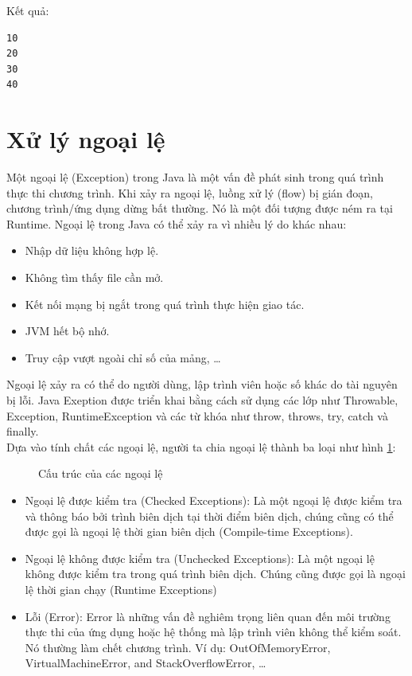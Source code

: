 \indent Kết quả:
\begin{verbatim}
10
20
30
40
\end{verbatim}

\section{Xử lý ngoại lệ}
\indent Một ngoại lệ (Exception) trong Java là một vấn đề phát sinh trong quá trình thực thi chương trình. Khi xảy ra ngoại lệ, luồng xử lý (flow) bị gián đoạn, chương trình/ứng dụng dừng bất thường. Nó là một đối tượng được ném ra tại Runtime. Ngoại lệ trong Java có thể xảy ra vì nhiều lý do khác nhau: 
\begin{itemize}
\item Nhập dữ liệu không hợp lệ.
\item Không tìm thấy file cần mở.
\item Kết nối mạng bị ngắt trong quá trình thực hiện giao tác.
\item JVM hết bộ nhớ.
\item Truy cập vượt ngoài chỉ số của mảng, …
\end{itemize}
\indent Ngoại lệ xảy ra có thể do người dùng, lập trình viên hoặc số khác do tài nguyên bị lỗi. Java Exeption được triển khai bằng cách sử dụng các lớp như {\ttfamily Throwable, Exception, RuntimeException} và các từ khóa như {\ttfamily throw, throws, try, catch và finally}.\\
\indent Dựa vào tính chất các ngoại lệ, người ta chia ngoại lệ thành ba loại như hình \ref{hinh17}:

\begin{figure}[!ht]
\centering

\caption{Cấu trúc của các ngoại lệ}\label{hinh17} 
\end{figure}

\begin{itemize}
\item Ngoại lệ được kiểm tra (Checked Exceptions): Là một ngoại lệ được kiểm tra và thông báo bởi trình biên dịch tại thời điểm biên dịch, chúng cũng có thể được gọi là ngoại lệ thời gian biên dịch (Compile-time Exceptions).
\item Ngoại lệ không được kiểm tra (Unchecked Exceptions): Là một ngoại lệ không được kiểm tra trong quá trình biên dịch. Chúng cũng được gọi là ngoại lệ thời gian chạy (Runtime Exceptions)
\item Lỗi (Error): Error là những vấn đề nghiêm trọng liên quan đến môi trường thực thi của ứng dụng hoặc hệ thống mà lập trình viên không thể kiểm soát. Nó thường làm chết chương trình. Ví dụ: OutOfMemoryError, VirtualMachineError, and StackOverflowError, …
\end{itemize}
 
